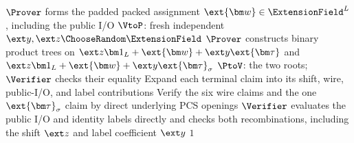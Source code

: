 \begin{algorithm}[!t]
\(\Prover\) forms the padded packed assignment
\(\ext{\bm w}\in\ExtensionField^L\), including the public I/O\;
\(\VtoP\): fresh independent
\(\ext y,\ext z\ChooseRandom\ExtensionField\)\;
\(\Prover\) constructs binary product trees on
\(\ext z\bm1_L+\ext{\bm w}+\ext y\ext{\bm\tau}\)
and
\(\ext z\bm1_L+\ext{\bm w}+\ext y\ext{\bm\tau}_\sigma\)\;
\(\PtoV\): the two roots; \(\Verifier\) checks their equality\;
Expand each terminal claim into its shift, wire, public-I/O,
and label contributions\;
Verify the six wire claims and the one
\(\ext{\bm\tau}_\sigma\) claim by direct underlying PCS openings\;
\(\Verifier\) evaluates the public I/O and identity labels
directly and checks both recombinations, including
the shift \(\ext z\) and label coefficient \(\ext y\)\;
\Return \(1\)\;
\end{algorithm}
